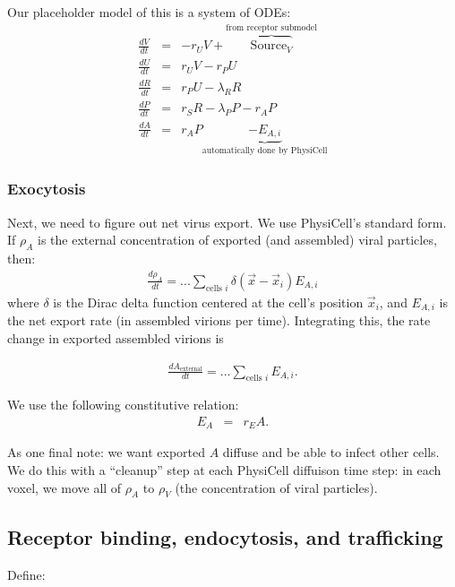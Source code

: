 \documentclass[12point]{article}
\begin{document}
Our placeholder model of this is a system of ODEs: 
\begin{eqnarray}
\frac{dV}{dt} & = & -r_U V  + \overbrace{ \textrm{Source}_V }^\textrm{from receptor submodel} \\
\frac{dU}{dt} & = & r_U V - r_P U \\
\frac{dR}{dt} & = & r_P U - \lambda_R R \\
\frac{dP}{dt} & = & r_S R - \lambda_P P - r_A P \\
\frac{dA}{dt} & = & r_A P \underbrace{- E_{A,i} }_{\textrm{automatically done by PhysiCell}}
\end{eqnarray}

\subsubsection{Exocytosis} 
Next, we need to figure out net virus export. We use PhysiCell's standard form. If $\rho_A$ is the external concentration of exported (and assembled) viral particles, then: 
\begin{eqnarray}
\frac{d\rho_A}{dt} = ... \sum_{\textrm{cells } i} \delta( \vec{x}-\vec{x}_i ) E_{A,i}
\end{eqnarray}
where $\delta$ is the Dirac delta function centered at the cell's position
$\vec{x}_i$, and $E_{A,i}$ is the net export rate (in assembled virions per time). Integrating this, 
the rate change in exported assembled virions is

\begin{eqnarray}
\frac{dA_\textrm{external}}{dt} = ... \sum_{\textrm{cells } i} E_{A,i}.
\end{eqnarray}


We use the following constitutive relation: 
\begin{eqnarray}
E_A & = & r_E A. 
\end{eqnarray}

As one final note: we want exported $A$ diffuse and be able to infect other cells. We do this with a ``cleanup'' step at each PhysiCell diffuison time step: in each voxel, we move all of $\rho_A$ to $\rho_V$ (the concentration 
of viral particles). 



\subsection{Receptor binding, endocytosis, and trafficking}
Define: \\
\end{document}
